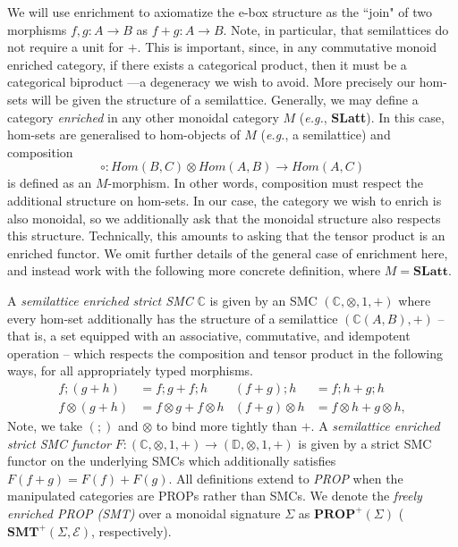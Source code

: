 We will use enrichment to axiomatize the e-box structure as the ``join" of two morphisms $f,g: A \to B$ as $f + g: A \to B$. Note, in particular,  that semilattices do not require a unit for $+$. This is important, since, in any commutative monoid enriched category,  if there exists a categorical product, then it must be a categorical biproduct \cite{maclane}---a degeneracy we wish to avoid.  More precisely our hom-sets will be given the structure of a semilattice.  
Generally,  we may define a category \textit{enriched} in any other monoidal category $M$ (\textit{e.g.},  \textbf{SLatt}).  In this case,  hom-sets are generalised to hom-objects of $M$ (\textit{e.g.},  a semilattice) and composition 
\[
	\circ: Hom(B,C) \otimes Hom(A,B) \to Hom(A,C)
\]
is defined as an $M$-morphism.  In other words,  composition must respect the additional structure on hom-sets.  
In our case,  the category we wish to enrich is also monoidal,  so we additionally ask that the monoidal structure also respects this structure.  Technically, this amounts to asking that the tensor product is an enriched functor. 
We omit further details of the general case of enrichment here, and instead work with the following more concrete definition, where $M = \textbf{SLatt}$.  

\begin{definition}\label{def:enriched-prop}
A \textit{semilattice enriched strict SMC}  $\mathbb{C}$ is given by an SMC $(\mathbb{C}, \otimes, 1,+)$ where every hom-set additionally has the structure of a semilattice $(\mathbb{C}(A,B), +)$ -- that is,  a set equipped with an associative,  commutative,  and idempotent operation -- which respects the composition and tensor product in the following ways,  for all appropriately typed morphisms.
\begin{align*}
f ; (g+h) &= f;g + f;h &
(f+g) ; h &= f;h + g;h \\
f \otimes (g+h) &= f \otimes g + f \otimes h & 
(f+g) \otimes h &= f \otimes h + g \otimes h,
\end{align*}
Note,  we take $(;\!)$ and $\otimes$ to bind more tightly than $+$.
A \textit{semilattice enriched strict SMC functor} $F: (\mathbb{C}, \otimes, 1,+) \to (\mathbb{D}, \otimes, 1,+)$ is given by a strict SMC functor on the underlying SMCs which additionally satisfies $F(f+g) = F(f)+F(g)$.
All definitions extend to \textit{PROP} when the manipulated categories are PROPs rather than SMCs. 
We denote the \textit{freely enriched PROP (SMT)} over a monoidal signature $\Sigma$ as $\textbf{PROP}^+(\Sigma)$ ($\textbf{SMT}^+(\Sigma, \mathcal{E})$,  respectively). 
\end{definition}

